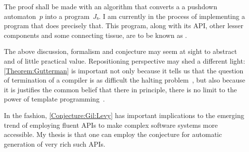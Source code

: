 The proof shall be made with an algorithm that converts a
 a pushdown automaton~$p$ into a program~$Jₛ$.
I am currently in the process of implementing a program that
  does precisely that.
This program, along with its API, other lesser components and
  some connecting tissue, are to be known as \SELF.

The above discussion, formalism and conjecture may seem at sight to abstract
  and of little practical value.
Repositioning perspective may shed a different light:
\cref{Theorem:Gutterman} is important not only because it tells us
  that the question of termination of a \CC compiler is as difficult
  the halting problem~\cite{Halting}, but also because it
  is justifies the common belief that there in principle, there
  is no limit to the power of template programming~\cite{Templates:find:6:refs}.

In the fashion, \cref{Conjecture:Gil:Levy} has important
  implications to the emerging trend of employing fluent APIs
  to make complex software systems more accessible.
My thesis is that one can employ the conjecture for
  automatic generation of very rich such APIs.
